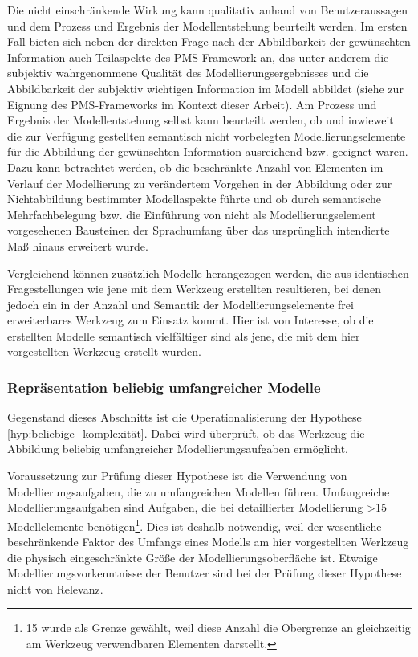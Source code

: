 Die nicht einschränkende Wirkung kann qualitativ anhand von Benutzeraussagen und dem Prozess und Ergebnis der Modellentstehung beurteilt werden. Im ersten Fall bieten sich neben der direkten Frage nach der Abbildbarkeit der gewünschten Information auch Teilaspekte des \gls{PMS}-Framework \citep{Sedera02} an, das unter anderem die subjektiv wahrgenommene Qualität des Modellierungsergebnisses und die Abbildbarkeit der subjektiv wichtigen Information im Modell abbildet (siehe \citep{Wahlmuller10} zur Eignung des \gls{PMS}-Frameworks im Kontext dieser Arbeit). Am Prozess und Ergebnis der Modellentstehung selbst kann beurteilt werden, ob und inwieweit die zur Verfügung gestellten semantisch nicht vorbelegten Modellierungselemente für die Abbildung der gewünschten Information ausreichend bzw. geeignet waren. Dazu kann betrachtet werden, ob die beschränkte Anzahl von Elementen im Verlauf der Modellierung zu verändertem Vorgehen in der Abbildung oder zur Nichtabbildung bestimmter Modellaspekte führte und ob durch semantische Mehrfachbelegung bzw. die Einführung von nicht als Modellierungselement vorgesehenen Bausteinen der Sprachumfang über das ursprünglich intendierte Maß hinaus erweitert wurde. 

Vergleichend können zusätzlich Modelle herangezogen werden, die aus identischen Fragestellungen wie jene mit dem Werkzeug erstellten resultieren, bei denen jedoch ein in der Anzahl und Semantik der Modellierungselemente frei erweiterbares Werkzeug zum Einsatz kommt. Hier ist von Interesse, ob die erstellten Modelle semantisch vielfältiger sind als jene, die mit dem hier vorgestellten Werkzeug erstellt wurden.


\subsubsection{Repräsentation beliebig umfangreicher Modelle} %
\label{ssub:repräsentation_beliebig_komplexer_modelle}

Gegenstand dieses Abschnitts ist die Operationalisierung der Hypothese \ref{hyp:beliebige_komplexität}. Dabei wird überprüft, ob das Werkzeug die Abbildung beliebig umfangreicher Modellierungsaufgaben ermöglicht.

Voraussetzung zur Prüfung dieser Hypothese ist die Verwendung von Modellierungsaufgaben, die zu umfangreichen Modellen führen. Umfangreiche Modellierungsaufgaben sind Aufgaben, die bei detaillierter Modellierung >15 Modellelemente benötigen\footnote{15 wurde als Grenze gewählt, weil diese Anzahl die Obergrenze an gleichzeitig am Werkzeug verwendbaren Elementen darstellt.}. Dies ist deshalb notwendig, weil der wesentliche beschränkende Faktor des Umfangs eines Modells am hier vorgestellten Werkzeug die physisch eingeschränkte Größe der Modellierungsoberfläche ist. Etwaige Modellierungsvorkenntnisse der Benutzer sind bei der Prüfung dieser Hypothese nicht von Relevanz.

